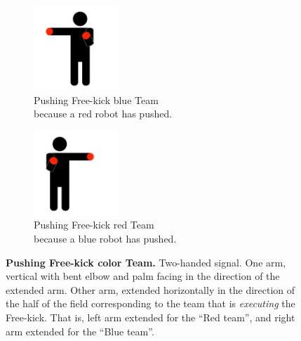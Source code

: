         \begin{figure}[ht!]
            \centering
            \begin{subfigure}{.33\textwidth}
                \centering
                \includegraphics[height=120px]{figs/referee-signals/pushing.png}
                \caption{{\color{blue}Pushing Free-kick \textlangle{}blue\textrangle{} Team}\\ because a {\color{red}red} robot has pushed.}
            \end{subfigure}
            \begin{subfigure}{.33\textwidth}
                \centering
                \includegraphics[height=120px]{figs/referee-signals/pushing-flipped.png}
                \caption{{\color{red}Pushing Free-kick \textlangle{}red\textrangle{} Team}\\ because a {\color{blue}blue} robot has pushed.}
            \end{subfigure}
            \caption{\textbf{Pushing Free-kick \textlangle{}color\textrangle{} Team.} Two-handed signal. One arm, vertical with bent elbow and palm facing in the direction of the extended arm. Other arm, extended horizontally in the direction of the half of the field corresponding to the team that is \emph{executing} the Free-kick. That is, left arm extended for the ``Red team'', and right arm extended for the ``Blue team''.}
        \end{figure}

